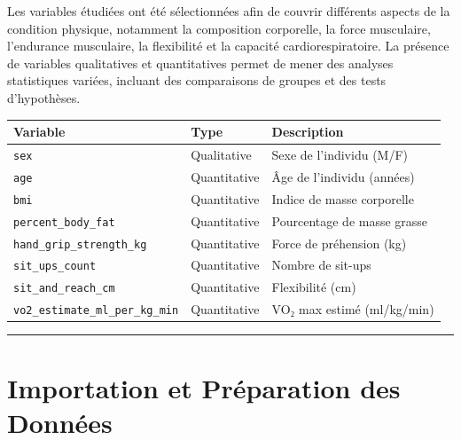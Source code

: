 \documentclass[
]{article}
\newcounter{none} %
\begin{document}
Les variables étudiées ont été sélectionnées afin de couvrir différents
aspects de la condition physique, notamment la composition corporelle,
la force musculaire, l'endurance musculaire, la flexibilité et la
capacité cardiorespiratoire. La présence de variables qualitatives et
quantitatives permet de mener des analyses statistiques variées,
incluant des comparaisons de groupes et des tests d'hypothèses.

{\def\LTcaptype{none} %
\begin{longtable}[]{@{}
  >{\raggedright\arraybackslash}p{}
  >{\raggedright\arraybackslash}p{}
  >{\raggedright\arraybackslash}p{}@{}}
\toprule\noalign{}
\begin{minipage}[b]{\linewidth}\raggedright
Variable
\end{minipage} & \begin{minipage}[b]{\linewidth}\raggedright
Type
\end{minipage} & \begin{minipage}[b]{\linewidth}\raggedright
Description
\end{minipage} \\
\midrule\noalign{}
\endhead
\bottomrule\noalign{}
\endlastfoot
\texttt{sex} & Qualitative & Sexe de l'individu (M/F) \\
\texttt{age} & Quantitative & Âge de l'individu (années) \\
\texttt{bmi} & Quantitative & Indice de masse corporelle \\
\texttt{percent\_body\_fat} & Quantitative & Pourcentage de masse
grasse \\
\texttt{hand\_grip\_strength\_kg} & Quantitative & Force de préhension
(kg) \\
\texttt{sit\_ups\_count} & Quantitative & Nombre de sit-ups \\
\texttt{sit\_and\_reach\_cm} & Quantitative & Flexibilité (cm) \\
\texttt{vo2\_estimate\_ml\_per\_kg\_min} & Quantitative & VO₂ max estimé
(ml/kg/min) \\
\end{longtable}
}

\begin{center}\rule{0.5\linewidth}{0.5pt}\end{center}

\section{Importation et Préparation des
Données}\label{importation-et-pruxe9paration-des-donnuxe9es}
\end{document}
